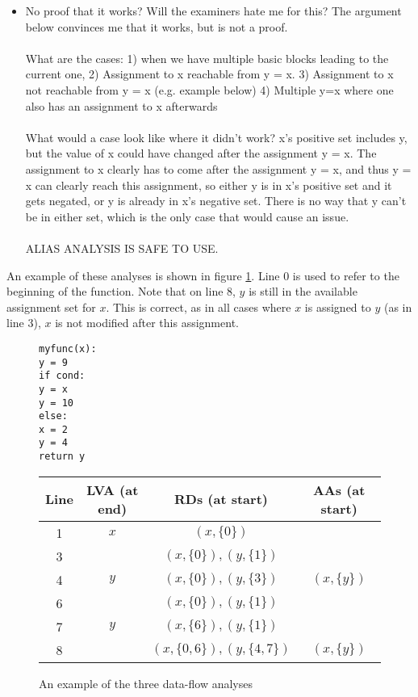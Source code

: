 \begin{itemize}
{\begin{itemize}
    \item No proof that it works? Will the examiners hate me for this? The argument below convinces me that it works, but is not a proof.\\\\What are the cases: 1) when we have multiple basic blocks leading to the current one, 2) Assignment to x reachable from y = x. 3) Assignment to x not reachable from y = x (e.g. example below) 4) Multiple y=x where one also has an assignment to x afterwards
    \\\\
    What would a case look like where it didn't work? x's positive set includes y, but the value of x could have changed after the assignment y = x. The assignment to x clearly has to come after the assignment y = x, and thus y = x can clearly reach this assignment, so either y is in x's positive set and it gets negated, or y is already in x's negative set. There is no way that y can't be in either set, which is the only case that would cause an issue.
    \\\\
    ALIAS ANALYSIS IS SAFE TO USE.
\end{itemize}}
\end{itemize}
An example of these analyses is shown in figure \ref{fig:dataflow}. Line 0 is used to refer to the beginning of the function. Note that on line 8, $y$ is still in the available assignment set for $x$. This is correct, as in all cases where $x$ is assigned to $y$ (as in line 3), $x$ is not modified after this assignment.
\begin{figure}[h]
\begin{minipage}{0.3\linewidth}
\begin{verbatim}
myfunc(x):
y = 9
if cond:
y = x
y = 10
else:
x = 2
y = 4
return y
\end{verbatim}
\end{minipage}
\begin{minipage}{0.7\linewidth}
\begin{center}
    \begin{tabular}{|c|c|c|c|}
        \hline
        Line & LVA (at end) & RDs (at start) & AAs (at start) \\
        \hline
        1 & $x$ & $(x, \{0\})$ & \\
        \hline
        3 & & $(x, \{0\}), (y, \{1\})$ & \\
        4 & $y$ & $(x, \{0\}), (y, \{3\})$ & $(x, \{y\})$ \\
        \hline
        6 & & $(x, \{0\}), (y, \{1\})$ & \\
        7 & $y$ & $(x, \{6\}), (y, \{1\})$ & \\
        \hline
        8 & & $(x, \{0, 6\}), (y, \{4, 7\})$ & $(x, \{y\})$ \\
        \hline
    \end{tabular}
\end{center}
\end{minipage}
\caption{An example of the three data-flow analyses}
\label{fig:dataflow}
\end{figure}
